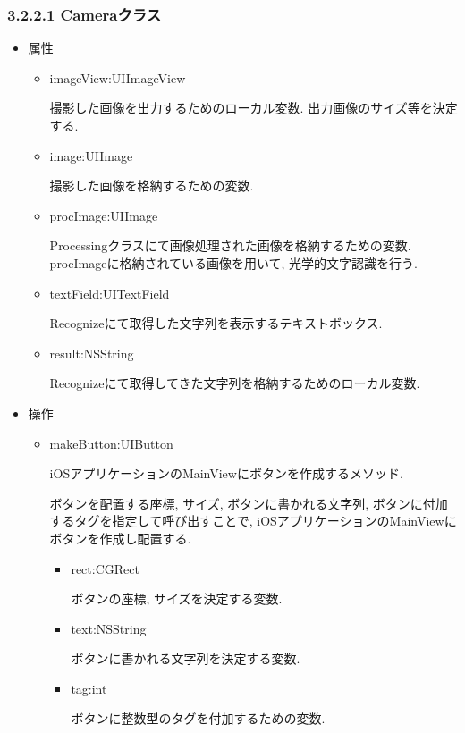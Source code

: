 \subsubsection{3.2.2.1 Cameraクラス}
\begin{itemize}
\item 属性

\begin{itemize}
\item imageView:UIImageView

撮影した画像を出力するためのローカル変数.
出力画像のサイズ等を決定する.

\item image:UIImage

撮影した画像を格納するための変数.

\item procImage:UIImage

Processingクラスにて画像処理された画像を格納するための変数.
procImageに格納されている画像を用いて, 光学的文字認識を行う.

\item textField:UITextField

Recognizeにて取得した文字列を表示するテキストボックス.

\item result:NSString

Recognizeにて取得してきた文字列を格納するためのローカル変数.
\end{itemize}

\item 操作

\begin{itemize}
\item makeButton:UIButton

iOSアプリケーションのMainViewにボタンを作成するメソッド.

ボタンを配置する座標, サイズ, ボタンに書かれる文字列, ボタンに付加するタグを指定して呼び出すことで, iOSアプリケーションのMainViewにボタンを作成し配置する.

\begin{itemize}
\item rect:CGRect

ボタンの座標, サイズを決定する変数.

\item text:NSString

ボタンに書かれる文字列を決定する変数.

\item tag:int

ボタンに整数型のタグを付加するための変数.
\end{itemize}


\end{itemize}
\end{itemize}

